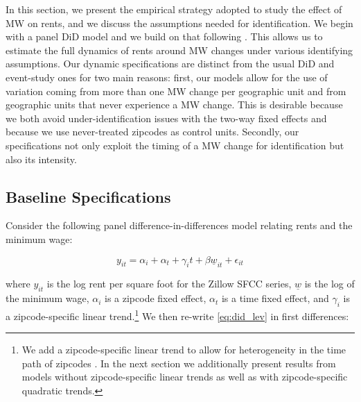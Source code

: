 
In this section, we present the empirical strategy adopted to study the effect of MW on rents, and 
we discuss the assumptions needed for identification. We begin with a panel DiD model and we build 
on that following \textcite{MeerWest2016}. This allows us to estimate the full dynamics of rents 
around MW changes under various identifying assumptions. Our dynamic specifications are distinct 
from the usual DiD and event-study ones \parencite{BorusyakJaravel2017, abraham2018} for two main 
reasons: first, our models allow for the use of variation coming from more than one MW change per 
geographic unit and from geographic units that never experience a MW change. This is desirable 
because we both avoid under-identification issues with the two-way fixed effects and because we 
use never-treated zipcodes as control units. Secondly, our specifications not only exploit the 
timing of a MW change for identification but also its intensity.
    


\subsection{Baseline Specifications}
Consider the following panel difference-in-differences model relating rents and the minimum wage:

\begin{equation}\label{eq:did_lev}
    y_{it} = \alpha_i + \alpha_t + \gamma_i t + \beta \underline{w}_{it} + \epsilon_{it}
\end{equation}
    
where $y_{it}$ is the log rent per square foot for the Zillow SFCC series, $\underline{w}$ is the 
log of the minimum wage, $\alpha_i$ is a zipcode fixed effect, $\alpha_t$ is a time fixed effect, 
and $\gamma_i$ is a zipcode-specific linear trend.\footnote{We add a zipcode-specific linear trend 
	to allow for heterogeneity in the time path of zipcodes \parencite{angrist2008mostly}. In the 
	next section we additionally present results from models without zipcode-specific linear trends 
	as well as with zipcode-specific quadratic trends.} 
We then re-write \autoref{eq:did_lev} in first differences:
    
